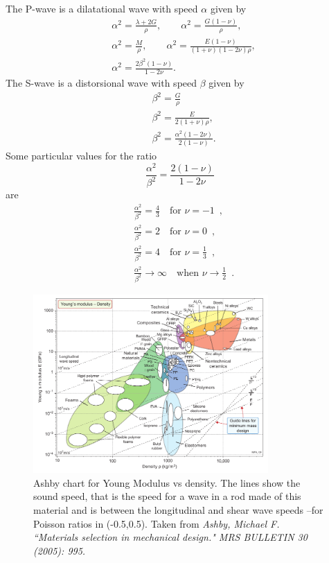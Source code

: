 \documentclass[12pt,letterpaper]{article}
\begin{document}
The P-wave is a dilatational wave with speed $\alpha$ given by 
\begin{align*}
 & \alpha^{2}=\frac{\lambda+2G}{\rho},\qquad\alpha^{2}=\frac{G(1-\nu)}{\rho},\\
 & \alpha^{2}=\frac{M}{\rho},\qquad\alpha^{2}=\frac{E(1-\nu)}{(1+\nu)(1-2\nu)\rho},\\
 & \alpha^{2}=\frac{2\beta^{2}(1-\nu)}{1-2\nu}.
\end{align*}
 The S-wave is a distorsional wave with speed $\beta$ given by 
\begin{align*}
 & \beta^{2}=\frac{G}{\rho}\\
 & \beta^{2}=\frac{E}{2(1+\nu)\rho},\\
 & \beta^{2}=\frac{\alpha^{2}(1-2\nu)}{2(1-\nu)}.
\end{align*}
 Some particular values for the ratio 
\[
\frac{\alpha^{2}}{\beta^{2}}=\frac{2(1-\nu)}{1-2\nu}
\]
 are 
\begin{align*}
 & \frac{\alpha^{2}}{\beta^{2}}=\frac{4}{3}\quad\mbox{for }\nu=-1\enspace,\\
 & \frac{\alpha^{2}}{\beta^{2}}=2\quad\mbox{for }\nu=0\enspace,\\
 & \frac{\alpha^{2}}{\beta^{2}}=4\quad\mbox{for }\nu=\frac{1}{3}\enspace,\\
 & \frac{\alpha^{2}}{\beta^{2}}\rightarrow\infty\quad\mbox{when }\nu\rightarrow\frac{1}{2}\enspace.
\end{align*}

\begin{figure}[h]
\centering
\includegraphics[width=0.8\textwidth]{img/E_vs_density-vector.pdf} 
\caption{Ashby chart for Young Modulus vs density. The lines show the sound speed, that is the speed for a wave in a rod made of this material and is between the longitudinal and shear wave speeds --for Poisson ratios in (-0.5,0.5). Taken from \emph{Ashby, Michael F. ``Materials selection in mechanical design." MRS BULLETIN 30 (2005): 995.}}
\end{figure}
\end{document}
